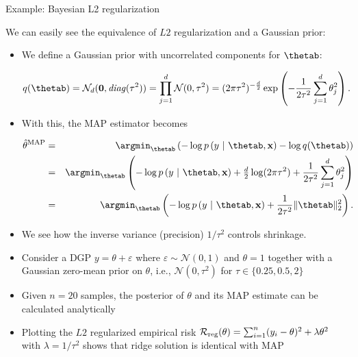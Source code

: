\documentclass[11pt,compress,t,notes=noshow, xcolor=table]{beamer}
\begin{document}
\begin{vbframe}{Example: Bayesian L2 regularization}

\small We can easily see the equivalence of $L2$ regularization and a Gaussian 
prior:

\begin{itemize}
  \small
  \item We define a Gaussian prior with uncorrelated components for $\thetab$:
  \begin{footnotesize}
    $$q(\thetab) = \mathcal{N}_d(\bm{0}, \mathit{diag}(\tau^2)) 
    = \prod_{j = 1}^d  \mathcal{N}(0, \tau^2)  
    = (2\pi\tau^2)^{-\frac{d}{2}} \exp \left( - \frac{1}{2\tau^2} \sum_{j = 1}^d 
    \theta_j^2 \right).$$
  \end{footnotesize} 
  \item With this, the MAP estimator becomes
  \begin{footnotesize}
  \begin{eqnarray*}
    \thetah^{\text{MAP}} &=& \argmin_{\thetab} \left(
    - \log p\left(y ~|~ \thetab, \xv \right) - \log q(\thetab)
    \right) \\
    &=& \argmin_{\thetab} \left(
    - \log p\left(y ~|~ \thetab, \xv \right) + \tfrac{d}{2} \log(2\pi \tau^2) +
    \frac{1}{2\tau^2} \sum_{j = 1}^d \theta_j^2
    \right) \\
    &=& \argmin_{\thetab} \left(
    - \log p\left(y ~|~ \thetab, \xv \right) + \frac{1}{2\tau^2} \| \thetab \|_2^2
    \right).
  \end{eqnarray*}
  \end{footnotesize} 
  \item We see how the inverse variance (precision) $1/\tau^2$ controls shrinkage.
\end{itemize}

\framebreak

\begin{itemize}
    \item Consider a DGP $y = \theta + \varepsilon$ where $\varepsilon \sim \mathcal{N}(0,1)$ and $\theta=1$ together with a Gaussian zero-mean prior on $\theta$, i.e., $\mathcal{N}(0, \tau^2)$ for $\tau \in \{0.25, 0.5, 2\}$
    \item Given $n=20$ samples, the posterior of $\theta$ and its MAP estimate can be calculated analytically
    \item Plotting the $L2$ regularized empirical risk $\mathcal{R}_{\text{reg}}(\theta) = \sum_{i=1}^{n} (y_i-\theta)^2+\lambda \theta^2$ with $\lambda = 1/\tau^2$ shows that ridge solution is identical with MAP
\end{itemize}


\end{vbframe}
\end{document}
